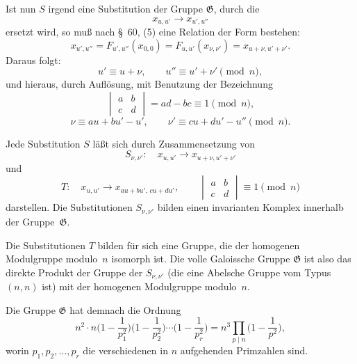 \documentclass[11pt,a4paper]{article}
\theoremstyle{plain}
\theoremstyle{remark}
\begin{document}
Ist nun $S$ irgend eine Substitution der Gruppe $\mathfrak{G}$,
durch die
\begin{equation}\label{eq:63:1}
x_{u,u'} \longrightarrow x_{u',u''}
\end{equation}
ersetzt wird, so muß nach §~60, (5) eine Relation der Form
bestehen:
\begin{equation}\label{eq:63:2}
x_{u',u''} = F_{u',u''}(x_{0,0})
= F_{u,u'}(x_{\nu,\nu'}) = x_{u+\nu,u'+\nu'}.
\end{equation}
Daraus folgt:
\begin{equation}\label{eq:63:3}
u' \equiv u+\nu,\qquad u'' \equiv u'+\nu' \pmod{n},
\end{equation}
und hieraus, durch Auflösung, mit Benutzung der Bezeichnung
\begin{equation}\label{eq:63:4}
\begin{vmatrix}
a & b\\
c & d
\end{vmatrix}
= ad-bc \equiv 1 \pmod{n},
\end{equation}
\begin{equation}\label{eq:63:5}
\nu \equiv au+bu'-u',\qquad
\nu' \equiv cu+du'-u'' \pmod{n}.
\end{equation}

Jede Substitution $S$ läßt sich durch Zusammensetzung von
\begin{equation}\label{eq:63:6}
S_{\nu,\nu'}:\quad x_{u,u'} \to x_{u+\nu,u'+\nu'}
\end{equation}
und
\begin{equation}\label{eq:63:7}
T:\quad x_{u,u'} \to x_{au+bu',\,cu+du'},
\qquad
\begin{vmatrix} a & b \\ c & d \end{vmatrix} \equiv 1 \pmod{n}
\end{equation}
darstellen. Die Substitutionen $S_{\nu,\nu'}$ bilden einen
invarianten Komplex innerhalb der Gruppe~$\mathfrak{G}$.

Die Substitutionen $T$ bilden für sich eine Gruppe, die der
homogenen Modulgruppe modulo~$n$ isomorph ist. Die volle
Galoissche Gruppe $\mathfrak{G}$ ist also das direkte Produkt
der Gruppe der $S_{\nu,\nu'}$ (die eine Abelsche Gruppe vom
Typus $(n,n)$ ist) mit der homogenen Modulgruppe modulo~$n$.

Die Gruppe $\mathfrak{G}$ hat demnach die Ordnung
\begin{equation}\label{eq:63:8}
n^2 \cdot n \biggl(1-\frac{1}{p_1^2}\biggr)
        \biggl(1-\frac{1}{p_2^2}\biggr)\cdots
        \biggl(1-\frac{1}{p_r^2}\biggr)
= n^3 \prod_{p\mid n}\biggl(1-\frac{1}{p^2}\biggr),
\end{equation}
worin $p_1, p_2,\dots,p_r$ die verschiedenen in $n$ aufgehenden
Primzahlen sind.
\end{document}
